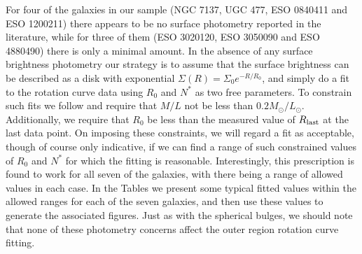 \documentclass[preprint,aps]{revtex4}
\begin{document}
For four of the galaxies in our sample (NGC 7137, UGC 477, ESO 0840411 and ESO 1200211) there appears to be no surface photometry reported in the literature, while for three of them (ESO 3020120, ESO 3050090 and ESO 4880490) there is only a minimal amount. In the absence of any surface brightness photometry our strategy is to assume that the surface brightness can be described as a disk with exponential $\Sigma(R)=\Sigma_0e^{-R/R_0}$, and simply do a fit to the rotation curve data using $R_0$ and $N^*$ as two free parameters. To constrain such fits we follow \cite{Sanders1996} and require that $M/L$ not be less than $0.2M_{\odot}/L_{\odot}$. Additionally, we require that $R_0$ be less than the measured value of $R_{\rm last}$ at the last data point. On imposing these constraints,  we will regard a fit as acceptable, though of course only indicative, if we can find a range of such constrained values of $R_0$ and $N^*$ for which the fitting is reasonable.  Interestingly, this prescription is found to work for all seven of the galaxies, with there being a range of allowed values in each case. In the Tables we present some typical fitted values within the allowed ranges for each of the seven galaxies,  and then use these values to generate the associated figures. Just as with the spherical bulges, we should note that none of these photometry concerns affect the outer region rotation curve fitting.
\end{document}
